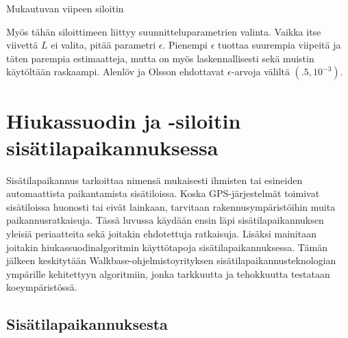 \documentclass[
  12pt,
  a4paper, twoside]{book}
\begin{document}
\begin{algorithm}[H]
\label{mukautuva-siloitin}
\DontPrintSemicolon
\SetAlgoShortEnd
{}
\caption{Mukautuvan viipeen siloitin}
\end{algorithm}

Myös tähän siloittimeen liittyy suunnitteluparametrien valinta. Vaikka itse viivettä \(L\) ei valita, pitää parametri \(\epsilon\). Pienempi \(\epsilon\) tuottaa suurempia viipeitä ja täten parempia estimaatteja, mutta on myös laskennallisesti sekä muistin käytöltään raskaampi. Alenlöv ja Olsson ehdottavat \(\epsilon\)-arvoja väliltä \((.5, 10^{-3})\).

\chapter{Hiukassuodin ja -siloitin sisätilapaikannuksessa} \label{paikannusesimerkki}

Sisätilapaikannus tarkoittaa nimensä mukaisesti ihmisten tai esineiden automaattista paikantamista sisätiloissa. Koska GPS-järjestelmät toimivat sisätiloissa huonosti tai eivät lainkaan, tarvitaan rakennusympäristöihin muita paikannusratkaisuja. Tässä luvussa käydään ensin läpi sisätilapaikannuksen yleisiä periaatteita sekä joitakin ehdotettuja ratkaisuja. Lisäksi mainitaan joitakin hiukassuodinalgoritmin käyttötapoja sisätilapaikannuksessa. Tämän jälkeen keskitytään Walkbase-ohjelmistoyrityksen sisätilapaikannusteknologian ympärille kehitettyyn algoritmiin, jonka tarkkuutta ja tehokkuutta testataan koeympäristössä.

\section{Sisätilapaikannuksesta}
\end{document}
